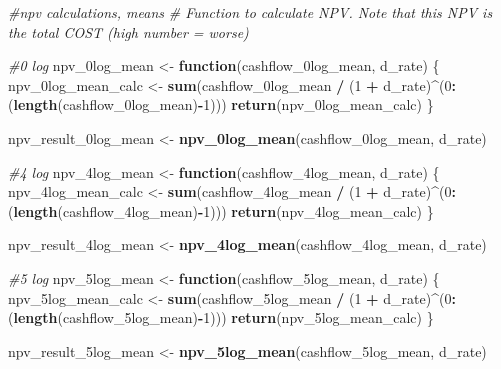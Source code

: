 \documentclass[
]{article}
\newenvironment{Shaded}{\begin{snugshade}}{\end{snugshade}}
\newcommand{\CommentTok}[1]{\textcolor[rgb]{0.56,0.35,0.01}{\textit{#1}}}
\newcommand{\ControlFlowTok}[1]{\textcolor[rgb]{0.13,0.29,0.53}{\textbf{#1}}}
\newcommand{\DecValTok}[1]{\textcolor[rgb]{0.00,0.00,0.81}{#1}}
\newcommand{\FunctionTok}[1]{\textcolor[rgb]{0.13,0.29,0.53}{\textbf{#1}}}
\newcommand{\NormalTok}[1]{#1}
\newcommand{\OtherTok}[1]{\textcolor[rgb]{0.56,0.35,0.01}{#1}}
\newcommand{\SpecialCharTok}[1]{\textcolor[rgb]{0.81,0.36,0.00}{\textbf{#1}}}
\begin{document}
\begin{Shaded}
\begin{Highlighting}[]
\CommentTok{\#npv calculations, means}
\CommentTok{\# Function to calculate NPV. Note that this NPV is the total COST (high number = worse)}

\CommentTok{\#0 log}
\NormalTok{npv\_0log\_mean }\OtherTok{\textless{}{-}} \ControlFlowTok{function}\NormalTok{(cashflow\_0log\_mean, d\_rate) \{}
\NormalTok{  npv\_0log\_mean\_calc }\OtherTok{\textless{}{-}} \FunctionTok{sum}\NormalTok{(cashflow\_0log\_mean }\SpecialCharTok{/}\NormalTok{ (}\DecValTok{1} \SpecialCharTok{+}\NormalTok{ d\_rate)}\SpecialCharTok{\^{}}\NormalTok{(}\DecValTok{0}\SpecialCharTok{:}\NormalTok{(}\FunctionTok{length}\NormalTok{(cashflow\_0log\_mean)}\SpecialCharTok{{-}}\DecValTok{1}\NormalTok{)))}
  \FunctionTok{return}\NormalTok{(npv\_0log\_mean\_calc)}
\NormalTok{\}}

\NormalTok{npv\_result\_0log\_mean }\OtherTok{\textless{}{-}} \FunctionTok{npv\_0log\_mean}\NormalTok{(cashflow\_0log\_mean, d\_rate)}

\CommentTok{\#4 log}
\NormalTok{npv\_4log\_mean }\OtherTok{\textless{}{-}} \ControlFlowTok{function}\NormalTok{(cashflow\_4log\_mean, d\_rate) \{}
\NormalTok{  npv\_4log\_mean\_calc }\OtherTok{\textless{}{-}} \FunctionTok{sum}\NormalTok{(cashflow\_4log\_mean }\SpecialCharTok{/}\NormalTok{ (}\DecValTok{1} \SpecialCharTok{+}\NormalTok{ d\_rate)}\SpecialCharTok{\^{}}\NormalTok{(}\DecValTok{0}\SpecialCharTok{:}\NormalTok{(}\FunctionTok{length}\NormalTok{(cashflow\_4log\_mean)}\SpecialCharTok{{-}}\DecValTok{1}\NormalTok{)))}
  \FunctionTok{return}\NormalTok{(npv\_4log\_mean\_calc)}
\NormalTok{\}}

\NormalTok{npv\_result\_4log\_mean }\OtherTok{\textless{}{-}} \FunctionTok{npv\_4log\_mean}\NormalTok{(cashflow\_4log\_mean, d\_rate)}



\CommentTok{\#5 log}
\NormalTok{npv\_5log\_mean }\OtherTok{\textless{}{-}} \ControlFlowTok{function}\NormalTok{(cashflow\_5log\_mean, d\_rate) \{}
\NormalTok{  npv\_5log\_mean\_calc }\OtherTok{\textless{}{-}} \FunctionTok{sum}\NormalTok{(cashflow\_5log\_mean }\SpecialCharTok{/}\NormalTok{ (}\DecValTok{1} \SpecialCharTok{+}\NormalTok{ d\_rate)}\SpecialCharTok{\^{}}\NormalTok{(}\DecValTok{0}\SpecialCharTok{:}\NormalTok{(}\FunctionTok{length}\NormalTok{(cashflow\_5log\_mean)}\SpecialCharTok{{-}}\DecValTok{1}\NormalTok{)))}
  \FunctionTok{return}\NormalTok{(npv\_5log\_mean\_calc)}
\NormalTok{\}}

\NormalTok{npv\_result\_5log\_mean }\OtherTok{\textless{}{-}} \FunctionTok{npv\_5log\_mean}\NormalTok{(cashflow\_5log\_mean, d\_rate)}
\end{Highlighting}
\end{Shaded}
\end{document}
